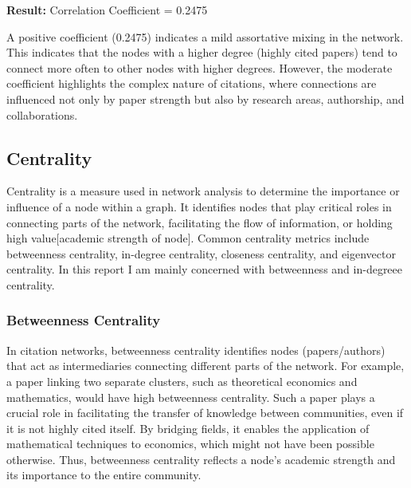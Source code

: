 \documentclass{article}
\begin{document}
\textbf{Result:} Correlation Coefficient = 0.2475

A positive coefficient (0.2475) indicates a mild assortative mixing in the network. This indicates that the nodes with a higher degree (highly cited papers) tend to connect more often to other nodes with higher degrees. However, the moderate coefficient highlights the complex nature of citations, where connections are influenced not only by paper strength but also by research areas, authorship, and collaborations.

\subsection{Centrality}
Centrality is a measure used in network analysis to determine the importance or influence of a node within a graph. It identifies nodes that play critical roles in connecting parts of the network, facilitating the flow of information, or holding high value[academic strength of node]. Common centrality metrics include betweenness centrality, in-degree centrality, closeness centrality, and eigenvector centrality. In this report I am mainly concerned with betweenness and in-degreee centrality.

\subsubsection{Betweenness Centrality}
In citation networks, betweenness centrality identifies nodes (papers/authors) that act as intermediaries connecting different parts of the network. For example, a paper linking two separate clusters, such as theoretical economics and mathematics, would have high betweenness centrality. Such a paper plays a crucial role in facilitating the transfer of knowledge between communities, even if it is not highly cited itself. By bridging fields, it enables the application of mathematical techniques to economics, which might not have been possible otherwise. Thus, betweenness centrality reflects a node's academic strength and its importance to the entire community.
\end{document}
